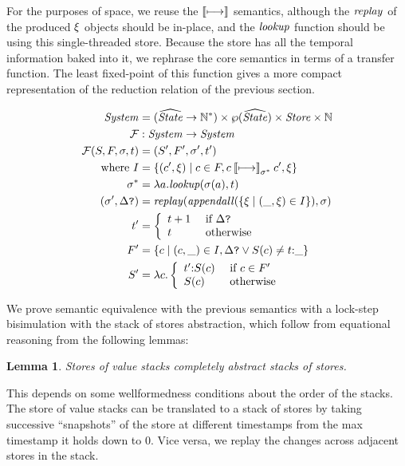 \documentclass[preprint,onecolumn,9pt]{sigplanconf} %
\newtheorem{lemma}{Lemma}
\begin{document}
For the purposes of space, we reuse the $\mathbin{\llbracket\mathbin{\longmapsto}\rrbracket}$ semantics,
although the $\mathit{replay}$ of the produced $\xi$ objects should be
in-place, and the $\mathit{lookup}$ function should be using this
single-threaded store.  Because the store has all the temporal
information baked into it, we rephrase the core semantics in terms of
a transfer function. The least fixed-point of this function gives a
more compact representation of the reduction relation of the previous
section.

{\small
\begin{align*}
\mathit{System} &= (\widehat{\mathit{State}} \to {{\mathbb N}}^*) \times \wp(\widehat{\mathit{State}}) \times \mathit{Store} \times {\mathbb N} \\
{\mathcal F} &: \mathit{System} \to \mathit{System} \\
{\mathcal F}(S,F, \sigma,t) &= (S',F',\sigma', t') \\
\text{ where }
I &= \{(c',\xi) \mid
       c \in F,
       c \mathbin{\llbracket\mathbin{\longmapsto}\rrbracket}_{\sigma^*} c',\xi\} \\
\sigma^* &= \lambda a.\mathit{lookup}(\sigma(a),t) \\
(\sigma', \Delta\mbox{{\tt ?}}) &= \mathit{replay}(\mathit{appendall}(\{\xi \mid (\_,\xi) \in I\}),\sigma) \\
t' &= \left\{\begin{array}{ll} t+1 & \text{ if } \Delta\mbox{{\tt ?}} \\
              t   & \text{ otherwise}
             \end{array}\right. \\
F' &= \{c \mid (c,\_) \in I, \Delta\mbox{{\tt ?}} \vee S(c) \neq t {\tt :} \_\} \\
S' &= \lambda c. \left\{\begin{array}{ll}
                               t' {\tt :} S(c) & \text{ if } c \in F' \\
                               S(c) & \text{ otherwise}
                             \end{array}\right.
\end{align*}}

We prove semantic equivalence with the previous semantics with a
lock-step bisimulation with the stack of stores abstraction, which
follow from equational reasoning from the following lemmas:

\begin{lemma}
Stores of value stacks completely abstract stacks of stores.
\end{lemma}
This depends on some wellformedness conditions about the order of the
stacks. The store of value stacks can be translated to a stack of
stores by taking successive ``snapshots'' of the store at different
timestamps from the max timestamp it holds down to 0. Vice versa, we
replay the changes across adjacent stores in the stack.
\end{document}
